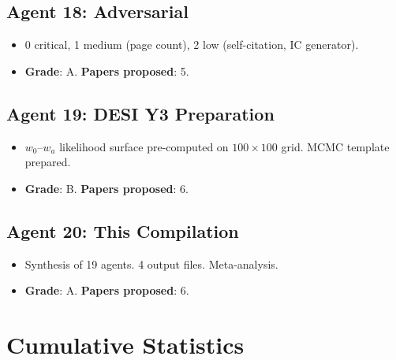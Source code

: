 \documentclass[11pt,a4paper]{article}
\begin{document}
\subsection{Agent 18: Adversarial}
\begin{itemize}[nosep]
\item 0 critical, 1 medium (page count), 2 low (self-citation, IC generator).
\item \textbf{Grade}: A. \textbf{Papers proposed}: 5.
\end{itemize}

\subsection{Agent 19: DESI Y3 Preparation}
\begin{itemize}[nosep]
\item $w_0$--$w_a$ likelihood surface pre-computed on $100 \times 100$ grid. MCMC template prepared.
\item \textbf{Grade}: B. \textbf{Papers proposed}: 6.
\end{itemize}

\subsection{Agent 20: This Compilation}
\begin{itemize}[nosep]
\item Synthesis of 19 agents. 4 output files. Meta-analysis.
\item \textbf{Grade}: A. \textbf{Papers proposed}: 6.
\end{itemize}

\section{Cumulative Statistics}
\end{document}
